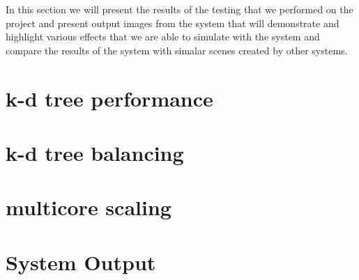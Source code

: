 In this section we will present the results of the testing that we performed on the project and
present output images from the system that will demonstrate and highlight various effects that
we are able to simulate with the system and compare the results of the system with simalar scenes
created by other systems.

\section{k-d tree performance}
\section{k-d tree balancing}
\missingfigure{}
\section{multicore scaling}

\section{System Output}




